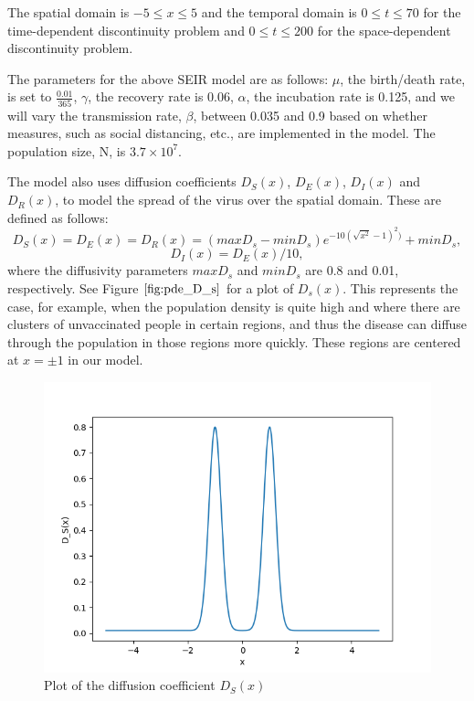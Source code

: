 \documentclass{article}
\begin{document}
The spatial domain is $-5 \leq x \leq 5$ and the temporal domain is $0 \leq t \leq 70$ for the time-dependent discontinuity problem and $0 \leq t \leq 200$ for the space-dependent discontinuity problem.

The parameters for the above SEIR model are as follows: $\mu$, the birth/death rate, is set to $\frac{0.01}{365}$, $\gamma$, the recovery rate is 0.06, $\alpha$, the incubation rate is 0.125, and we will vary the transmission rate, $\beta$, between 0.035 and 0.9 based on whether measures, such as social distancing, etc., are implemented in the model. The population size, N, is $3.7 \times 10^{7}$.

The model also uses diffusion coefficients $D_S(x)$, $D_E(x)$, $D_I(x)$ and $D_R(x)$, to model the spread of the virus over the spatial domain. These are defined as follows:
\begin{equation}
D_S(x) = D_E(x) = D_R(x) = (maxD_s - minD_s)e^{-10(\sqrt{x^{2}} - 1)^2)} + minD_s,
\end{equation} 
\begin{equation}
D_I(x) = D_E(x)/10,
\end{equation}
where the diffusivity parameters $maxD_s$ and $minD_s$ are 0.8 and 0.01, respectively. See Figure $\ref{fig:pde_D_s}$ for a plot of $D_s(x)$. This represents the case, for example, when the population density is quite high and where there are clusters of unvaccinated people in certain regions, and thus the disease can diffuse through the population in those regions more quickly. These regions are centered at $x= \pm 1$ in our model.

\begin{figure}[H]
\centering
\includegraphics[width=0.7\linewidth]{./figures/pde_D_s}
\caption{Plot of the diffusion coefficient $D_S(x)$}
\label{fig:pde_D_s}
\end{figure}
\end{document}
